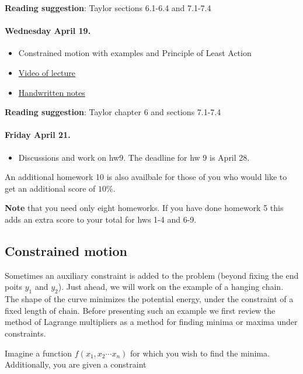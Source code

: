 \documentclass[%
oneside,                 %
final,                   %
10pt]{article}
\begin{document}
\noindent
\textbf{Reading suggestion}: Taylor sections 6.1-6.4 and 7.1-7.4

\paragraph{Wednesday April 19.}
\begin{itemize}
\item Constrained motion with examples and Principle of Least Action

\item \href{{https://youtu.be/}}{Video of lecture}

\item \href{{https://github.com/mhjensen/Physics321/blob/master/doc/HandWrittenNotes/Spring2023/NotesApril19.pdf}}{Handwritten notes}
\end{itemize}

\noindent
\textbf{Reading suggestion}: Taylor chapter 6 and sections 7.1-7.4

\paragraph{Friday April 21.}
\begin{itemize}
\item Discussions and work on hw9. The deadline for hw 9 is April 28.
\end{itemize}

\noindent
An additional homework 10 is also availbale for those of you who would like to get an additional score of $10\%$. 

\textbf{Note} that you need only eight homeworks. If you have done homework 5 this adds an extra score to your total for hws 1-4 and 6-9.

\subsection*{Constrained motion}

Sometimes an auxiliary constraint is added to the problem (beyond
fixing the end poits $y_1$ and $y_2$). Just ahead, we will work on the
example of a hanging chain. The shape of the curve minimizes the
potential energy, under the constraint of a fixed length of
chain. Before presenting such an example we first review the method of
Lagrange multipliers as a method for finding minima or maxima under
constraints.

Imagine a function $f(x_1,x_2\cdots x_n)$ for which you wish to find
the minima. Additionally, you are given a constraint
\end{document}
